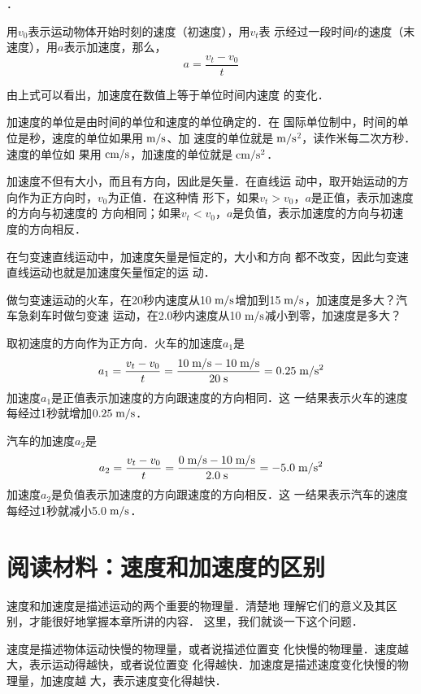 ．

用$v_0$表示运动物体开始时刻的速度（初速度），用$v_t$表
示经过一段时间$t$的速度（末速度），用$a$表示加速度，那么，
\[a=\frac{v_t-v_0}{t}\]

由上式可以看出，加速度在数值上等于单位时间内速度
的变化．

    加速度的单位是由时间的单位和速度的单位确定的．在
国际单位制中，时间的单位是秒，速度的单位如果用$\;\text{m}/\text{s}$、加
速度的单位就是$\;\text{m}/\text{s}$$^2$，读作米每二次方秒．速度的单位如
果用$\;\text{cm}/\text{s}$，加速度的单位就是$\;\text{cm}/\text{s}^2$．

    加速度不但有大小，而且有方向，因此是矢量．在直线运
动中，取开始运动的方向作为正方向时，$v_0$为正值．在这种情
形下，如果$v_t>v_0$，$a$是正值，表示加速度的方向与初速度的
方向相同；如果$v_t<v_0$，$a$是负值，表示加速度的方向与初速
度的方向相反．

    在匀变速直线运动中，加速度矢量是恒定的，大小和方向
都不改变，因此匀变速直线运动也就是加速度矢量恒定的运
动．

\begin{example}
做匀变速运动的火车，在20秒内速度从10$\;\text{m}/\text{s}$增加到15$\;\text{m}/\text{s}$，加速度是多大？汽车急刹车时做匀变速
运动，在2.0秒内速度从10$\;\text{m}/\text{s}$减小到零，加速度是多大？
\end{example}

\begin{solution}
取初速度的方向作为正方向．火车的加速度$a_1$是
\[a_1=\frac{v_t-v_0}{t}=\frac{10 \;\text{m}/\text{s} -10\;\text{m}/\text{s}}{20\;\text{s}}=0.25\;\text{m}/\text{s}^2 \]
加速度$a_1$是正值表示加速度的方向跟速度的方向相同．这
一结果表示火车的速度每经过1秒就增加$0.25 \;\text{m}/\text{s} $．

汽车的加速度$a_2$是
\[a_2=\frac{v_t-v_0}{t}=\frac{0\;\text{m}/\text{s}-10\;\text{m}/\text{s}}{2.0\;\text{s} }=-5.0\;\text{m}/\text{s}^2  \]
加速度$a_2$是负值表示加速度的方向跟速度的方向相反．这
一结果表示汽车的速度每经过1秒就减小5.0$\;\text{m}/\text{s}$．

\end{solution}

\section*{阅读材料：速度和加速度的区别}
    速度和加速度是描述运动的两个重要的物理量．清楚地
理解它们的意义及其区别，才能很好地掌握本章所讲的内容．
这里，我们就谈一下这个问题．

    速度是描述物体运动快慢的物理量，或者说描述位置变
化快慢的物理量．速度越大，表示运动得越快，或者说位置变
化得越快．加速度是描述速度变化快慢的物理量，加速度越
大，表示速度变化得越快．

